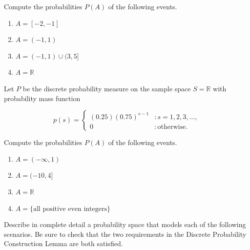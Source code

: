 \documentclass[12pt,reqno]{amsart}
\begin{document}
Compute the probabilities $P(A)$ of the following events.

\medskip
\begin{enumerate}
\item $A = [-2, -1]$\vfill
\item $A = (-1, 1)$\vfill
\item $A = (-1, 1) \cup (3,5]$\vfill
\item $A = \mathbb{R}$\vfill
\end{enumerate}













\prob Let $P$ be the discrete probability measure on the sample space $S=\mathbb{R}$ with probability mass function

	\[
	p(s) = \begin{cases}
    	(0.25) (0.75)^{s-1} & : s=1, 2, 3, \ldots, \\
	0 & : \text{otherwise}.
	\end{cases}
	\]

Compute the probabilities $P(A)$ of the following events.

\medskip
\begin{enumerate}
\item $A = (-\infty,1)$\vfill
\item $A = (-10, 4]$\vfill
\item $A = \mathbb{R}$\vfill
\item $A = \{\text{all positive even integers}\}$\vfill
\end{enumerate}
















\newpage
\prob Describe in complete detail a probability space that models each of the following scenarios. Be sure to check that the two requirements in the Discrete Probability Construction Lemma are both satisfied.
\end{document}

